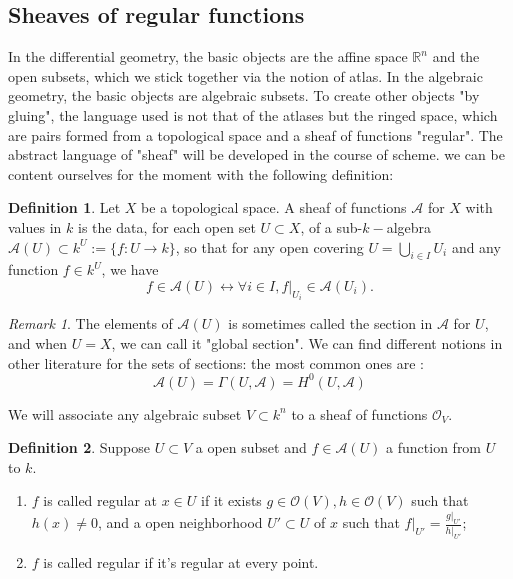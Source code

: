 \documentclass[12pt,a4paper,english]{article}
\theoremstyle{plain}
\theoremstyle{definition}
\newtheorem{defi}{Definition}
\theoremstyle{remark}
\newtheorem*{rem}{Remark}
\begin{document}
\subsection{Sheaves of regular functions}
In the differential geometry, the basic objects are the affine space $\mathbb{R}^{n}$ and the open subsets, which we stick together via the notion of atlas. In the algebraic geometry, the basic objects are algebraic subsets. To create other objects "by gluing", the language used is not that of the atlases but the ringed space, which are pairs formed from a topological space and a sheaf of functions "regular". The abstract language of "sheaf" will be developed in the course of scheme. we can be  content ourselves for the moment with the following definition:
\begin{defi}
Let $X$ be a topological space. A sheaf of functions $\mathcal{A}$ for $X$ with values in $k$ is the data, for each open set $U\subset X$, of a sub-$k-$algebra $\mathcal{A}(U)\subset k^{U}:=\{f:U\rightarrow k\}$, so that for any open covering $U=\bigcup_{i\in I}U_{i}$ and any function $f\in k^{U}$, we have 
\begin{equation*}
    f\in\mathcal{A}(U)\leftrightarrow \forall i\in I, f|_{U_{i}}\in \mathcal{A}(U_{i}).
\end{equation*}
\end{defi}
\begin{rem}
The elements of $\mathcal{A}(U)$ is sometimes called the section in $\mathcal{A}$ for $U$, and when $U=X$, we can call it "global section". We can find different notions in other literature for the sets of sections: the most common ones are :
\begin{equation*}
    \mathcal{A}(U)=\Gamma(U,\mathcal{A})=H^{0}( U,\mathcal{A})
\end{equation*}
\end{rem}
We will associate any algebraic subset $V\subset k^{n}$ to a sheaf of functions $\mathcal{O}_{V}$.
\begin{defi}
Suppose $U\subset V$ a open subset and $f\in\mathcal{A}(U)$ a function from $U$ to $k$.
\begin{enumerate}
    \item $f$ is called regular at $x\in U$ if it exists $g\in\mathcal{O}(V), h\in\mathcal{O}(V)$ such that $h(x)\not=0$, and a open neighborhood $U'\subset U$ of $x$ such that $f|_{U'}=\frac{g|_{U'}}{h|_{U'}}$;
    \item $f$ is called regular if it's regular at every point.
\end{enumerate}
\end{defi}
\end{document}
